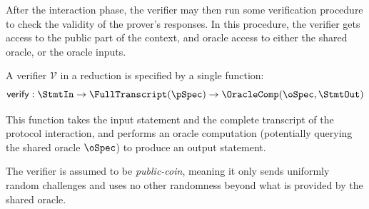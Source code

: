
After the interaction phase, the verifier may then run some verification procedure to check the
validity of the prover's responses. In this procedure, the verifier gets access to the public part
of the context, and oracle access to either the shared oracle, or the oracle inputs.

\begin{definition}
    \label{def:verifier}
    A verifier $\mathcal{V}$ in a reduction is specified by a single function:
    \[ \mathsf{verify} : \StmtIn \to \FullTranscript(\pSpec) \to \OracleComp(\oSpec, \StmtOut) \]

    This function takes the input statement and the complete transcript of the protocol interaction, and performs an oracle computation (potentially querying the shared oracle $\oSpec$) to produce an output statement.

    The verifier is assumed to be \emph{public-coin}, meaning it only sends uniformly random challenges and uses no other randomness beyond what is provided by the shared oracle.
\end{definition}

